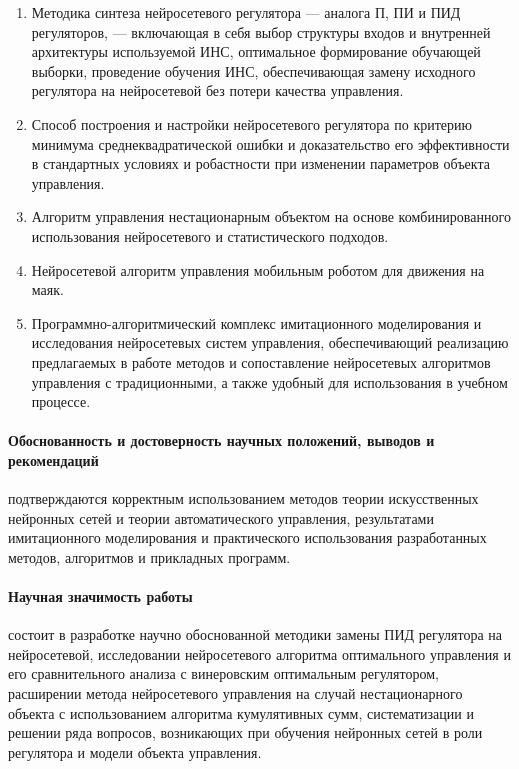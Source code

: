 \begin{enumerate}
\item 
Методика синтеза нейросетевого регулятора --- аналога П, ПИ и ПИД
регуляторов, --- включающая в себя выбор структуры входов и внутренней
архитектуры используемой ИНС, оптимальное формирование обучающей
выборки, проведение обучения ИНС, обеспечивающая замену исходного
регулятора на нейросетевой без потери качества управления.

\item
Способ построения и настройки нейросетевого регулятора по критерию
минимума среднеквадратической ошибки и доказательство его
эффективности в стандартных условиях и робастности при изменении
параметров объекта управления.

\item
Алгоритм управления нестационарным объектом на основе комбинированного
использования нейросетевого и статистического подходов.

\item
Нейросетевой алгоритм управления мобильным роботом для движения на маяк.

\item
Программно-алгоритмический комплекс имитационного моделирования и
исследования нейросетевых систем управления, обеспечивающий реализацию
предлагаемых в работе методов и сопоставление нейросетевых алгоритмов
управления с традиционными, а также удобный для использования в
учебном процессе.
\end{enumerate}


\paragraph{Обоснованность и достоверность научных положений, выводов
и рекомендаций} подтверждаются корректным использованием методов
теории искусственных нейронных сетей и теории автоматического
управления, результатами имитационного моделирования и практического
использования разработанных методов, алгоритмов и прикладных программ.

\paragraph{Научная значимость работы} состоит в разработке научно
обоснованной методики замены ПИД регулятора на нейросетевой,
исследовании нейросетевого алгоритма оптимального управления и его
сравнительного анализа с винеровским оптимальным регулятором,
расширении метода нейросетевого управления на случай нестационарного
объекта с использованием алгоритма кумулятивных сумм, систематизации и
решении ряда вопросов, возникающих при обучения нейронных сетей в роли
регулятора и модели объекта управления.

